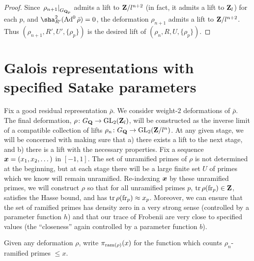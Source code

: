 \begin{proof}
Since $\left.\rho_{n+1}\right|_{G_{\mathbf{Q}_p}}$ admits a lift to $\mathbf{Z}/l^{n+2}$ (in 
fact, it admits a lift to $\mathbf{Z}_l$) for each $p$, and 
$\sha_{R'}^2(\Ad^0\bar\rho) = 0$, the deformation $\rho_{n+1}$ admits a lift to 
$\mathbf{Z}/l^{n+2}$. Thus $(\rho_{n+1},R',U',\{\rho_p\})$ is the desired lift of 
$(\rho_n,R,U,\{\rho_p\})$. 
\end{proof}





\section{Galois representations with specified Satake parameters}

Fix a good residual representation $\bar\rho$. We 
consider weight-$2$ deformations of $\bar\rho$. The final deformation, 
$\rho\colon G_{\mathbf{Q}} \to \operatorname{GL}_2(\mathbf{Z}_l)$, will be constructed as the inverse limit 
of a compatible collection of lifts $\rho_n\colon G_{\mathbf{Q}} \to \operatorname{GL}_2(\mathbf{Z}/l^n)$. At 
any given stage, we will be concerned with making sure that a) there exists a 
lift to the next stage, and b) there is a lift with the necessary properties. 
Fix a sequence ${\boldsymbol x}=(x_1,x_2,\dots)$ in $[-1,1]$. The set of unramified primes 
of $\rho$ is not determined at the beginning, but at each stage there will be 
a large finite set $U$ of primes which we know will remain unramified. 
Re-indexing ${\boldsymbol x}$ by these unramified primes, we will construct $\rho$ so that 
for all unramified primes $p$, $\operatorname{tr}\rho(\mathrm{fr}_p)\in \mathbf{Z}$, satisfies the Hasse 
bound, and has $\operatorname{tr}\rho(\mathrm{fr}_p) \approx x_p$. Moreover, we can ensure that the 
set of ramified primes has density zero in a very strong sense (controlled by a 
parameter function $h$) and that our trace of Frobenii are very close to 
specified values (the ``closeness'' again controlled by a parameter function 
$b$). 

Given any deformation $\rho$, write $\pi_{\mathrm{ram}(\rho)}(x)$ for the function 
which counts $\rho_n$-ramified primes $\leqslant x$. 

